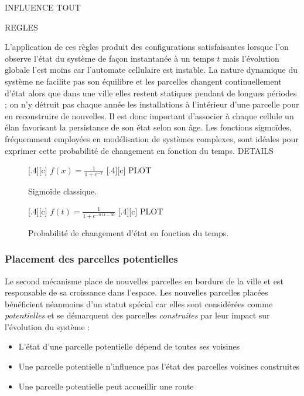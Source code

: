 \documentclass[12pt]{article}
\begin{document}
INFLUENCE TOUT

REGLES

L'application de ces règles produit des configurations satisfaisantes
lorsque l'on observe l'état du système de façon instantanée à un temps
$t$ mais l'évolution globale l'est moins car l'automate cellulaire est
instable. La nature dynamique du système ne facilite pas son équilibre
et les parcelles changent continuellement d'état alors que dans une
ville elles restent statiques pendant de longues périodes ; on n'y
détruit pas chaque année les installations à l'intérieur d'une
parcelle pour en reconstruire de nouvelles. Il est donc important
d'associer à chaque cellule un élan favorisant la persistance de son
état selon son âge. Les fonctions sigmoïdes, fréquemment employées en
modélisation de systèmes complexes, sont idéales pour exprimer cette
probabilité de changement en fonction du temps. DETAILS

\begin{figure}[ht]
  \centering
  \subcaptionbox{}[.4\linewidth][c]{
    $f(x) = \frac{1}{1 + e^{-x}}$
  }
  \subcaptionbox{}[.4\linewidth][c]{
    PLOT
  }
  \caption{Sigmoïde classique.}
  \label{fig:sigmoide1}
\end{figure}


\begin{figure}[ht]
  \centering
  \subcaptionbox{}[.4\linewidth][c]{
    $f(t) = \frac{1}{1 + e^{-0.1t-50}}$
  }
  \subcaptionbox{}[.4\linewidth][c]{
    PLOT
  }
  \caption{Probabilité de changement d'état en fonction du temps.}
  \label{fig:sigmoide1}
\end{figure}

\subsubsection{Placement des parcelles potentielles}

Le second mécanisme place de nouvelles parcelles en bordure de la
ville et est responsable de sa croissance dans l'espace. Les nouvelles
parcelles placées bénéficient néanmoins d'un statut spécial car elles
sont considérées comme \textit{potentielles} et se démarquent des
parcelles \textit{construites} par leur impact sur l'évolution du
système :

\begin{itemize}
\item{L'état d'une parcelle potentielle dépend de toutes ses voisines}
\item{Une parcelle potentielle n'influence pas l'état des parcelles
  voisines construites}
\item{Une parcelle potentielle peut accueillir une route}
\end{itemize}
\end{document}
